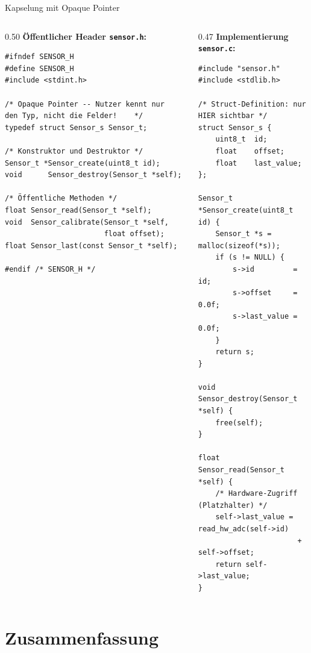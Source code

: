 \documentclass[%
  aspectratio=169,
  10pt
]{beamer}
\begin{document}
\begin{frame}[fragile]{Kapselung mit Opaque Pointer}
  \begin{columns}[T]
    \begin{column}{0.50\textwidth}
      \textbf{Öffentlicher Header \texttt{sensor.h}:}
\begin{lstlisting}
#ifndef SENSOR_H
#define SENSOR_H
#include <stdint.h>

/* Opaque Pointer -- Nutzer kennt nur   den Typ, nicht die Felder!    */
typedef struct Sensor_s Sensor_t;

/* Konstruktor und Destruktor */
Sensor_t *Sensor_create(uint8_t id);
void      Sensor_destroy(Sensor_t *self);

/* Öffentliche Methoden */
float Sensor_read(Sensor_t *self);
void  Sensor_calibrate(Sensor_t *self,
                       float offset);
float Sensor_last(const Sensor_t *self);

#endif /* SENSOR_H */
\end{lstlisting}
    \end{column}
    \begin{column}{0.47\textwidth}
      \textbf{Implementierung \texttt{sensor.c}:}
\begin{lstlisting}
#include "sensor.h"
#include <stdlib.h>

/* Struct-Definition: nur HIER sichtbar */
struct Sensor_s {
    uint8_t  id;
    float    offset;
    float    last_value;
};

Sensor_t *Sensor_create(uint8_t id) {
    Sensor_t *s = malloc(sizeof(*s));
    if (s != NULL) {
        s->id         = id;
        s->offset     = 0.0f;
        s->last_value = 0.0f;
    }
    return s;
}

void Sensor_destroy(Sensor_t *self) {
    free(self);
}

float Sensor_read(Sensor_t *self) {
    /* Hardware-Zugriff (Platzhalter) */
    self->last_value = read_hw_adc(self->id)
                       + self->offset;
    return self->last_value;
}
\end{lstlisting}
    \end{column}
  \end{columns}
\end{frame}

\section{Zusammenfassung}
\end{document}
